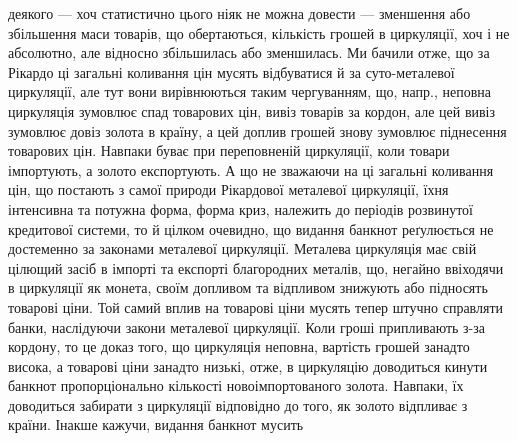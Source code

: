 деякого — хоч статистично цього ніяк не можна довести — зменшення або збільшення
маси товарів, що обертаються, кількість грошей в циркуляції, хоч і не
абсолютно, але відносно збільшилась або зменшилась. Ми бачили отже, що за
Рікардо ці загальні коливання цін мусять відбуватися й за суто-металевої циркуляції,
але тут вони вирівнюються таким чергуванням, що, напр., неповна
циркуляція зумовлює спад товарових цін, вивіз товарів за кордон, але цей вивіз
зумовлює довіз золота в країну, а цей доплив грошей знову зумовлює піднесення
товарових цін. Навпаки буває при переповненій циркуляції, коли товари імпортують,
а золото експортують. А що не зважаючи на ці загальні коливання цін,
що постають з самої природи Рікардової металевої циркуляції, їхня інтенсивна
та потужна форма, форма криз, належить до періодів розвинутої кредитової системи,
то й цілком очевидно, що видання банкнот реґулюється не достеменно за законами
металевої циркуляції. Металева циркуляція має свій цілющий засіб в імпорті
та експорті благородних металів, що, негайно ввіходячи в циркуляції як монета,
своїм допливом та відпливом знижують або підносять товарові ціни. Той самий
вплив на товарові ціни мусять тепер штучно справляти банки, наслідуючи закони
металевої циркуляції. Коли гроші припливають з-за кордону, то це доказ того,
що циркуляція неповна, вартість грошей занадто висока, а товарові ціни занадто
низькі, отже, в циркуляцію доводиться кинути банкнот пропорціонально кількості
новоімпортованого золота. Навпаки, їх доводиться забирати з циркуляції відповідно
до того, як золото відпливає з країни. Інакше кажучи, видання банкнот мусить
\parbreak{}  %
